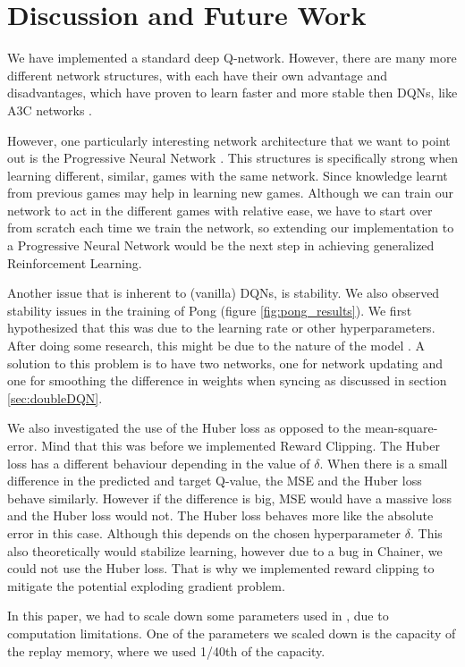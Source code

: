 \documentclass{article}
\begin{document}
\section{Discussion and Future Work}
We have implemented a standard deep Q-network. However, there are many more different network structures, with each have their own advantage and disadvantages, which have proven to learn faster and more stable then DQNs, like A3C networks \cite{DBLP:journals/corr/MnihBMGLHSK16}. 

However, one particularly interesting network architecture that we want to point out is the Progressive Neural Network \cite{DBLP:journals/corr/RusuRDSKKPH16}. This structures is specifically strong when learning different, similar, games with the same network. Since knowledge learnt from previous games may help in learning new games. Although we can train our network to act in the different games with relative ease, we have to start over from scratch each time we train the network, so extending our implementation to a Progressive Neural Network would be the next step in achieving generalized Reinforcement Learning.

Another issue that is inherent to (vanilla) DQNs, is stability. We also observed stability issues in the training of Pong (figure \ref{fig:pong_results}). We first hypothesized that this was due to the learning rate or other hyperparameters. After doing some research, this might be due to the nature of the model \cite{van2016deep}. A solution to this problem is to have two networks, one for network updating and one for smoothing the difference in weights when syncing as discussed in section \ref{sec:doubleDQN}.

We also investigated the use of the Huber loss as opposed to the mean-square-error. Mind that this was before we implemented Reward Clipping. The Huber loss has a different behaviour depending in the value of $\delta$. When there is a small difference in the predicted and target Q-value, the MSE and the Huber loss behave similarly. However if the difference is big, MSE would have a massive loss and the Huber loss would not. The Huber loss behaves more like the absolute error in this case. Although this depends on the chosen hyperparameter $\delta$. This also theoretically would stabilize learning, however due to a bug in Chainer, we could not use the Huber loss. That is why we implemented reward clipping to mitigate the potential exploding gradient problem.

In this paper, we had to scale down some parameters used in \cite{mnih2015human}, due to computation limitations. One of the parameters we scaled down is the capacity of the replay memory, where we used 1/40th of the capacity.




\end{document}
